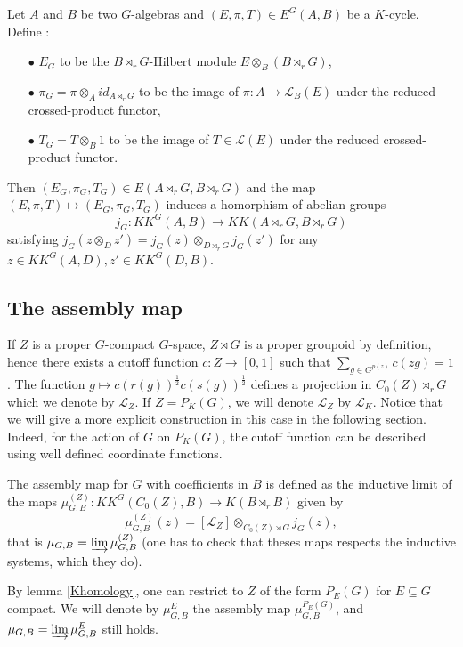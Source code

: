 Let $A$ and $B$ be two $G$-algebras and $(E,\pi,T)\in E^G(A,B)$ be a $K$-cycle. Define :
\begin{itemize}
\item[$\bullet$] $E_G$ to be the $B\rtimes_r G$-Hilbert module $E\otimes_B (B\rtimes_r G)$,
\item[$\bullet$] $\pi_G = \pi\otimes_{A}id_{A\rtimes_r G} $ to be the image of $\pi:A \rightarrow \mathcal L_B(E)$ under the reduced crossed-product functor,
\item[$\bullet$] $T_G = T\otimes_{B}1$ to be the image of $T\in\mathcal L(E)$ under the reduced crossed-product functor.
\end{itemize}
Then $(E_G,\pi_G,T_G)\in E(A\rtimes_r G,B\rtimes_r G)$ and the map $(E,\pi,T)\mapsto (E_G,\pi_G,T_G) $ induces a homorphism of abelian groups
\[j_G : KK^G(A,B)\rightarrow KK(A\rtimes_r G,B\rtimes_r G)\]
satisfying $j_G(z\otimes_D z')=j_G(z)\otimes_{D\rtimes_r G} j_G(z')$ for any $z\in KK^G(A,D), z'\in KK^G(D,B)$.\\ 

\subsection{The assembly map}

If $Z$ is a proper $G$-compact $G$-space, $Z\rtimes G$ is a proper groupoid by definition, hence there exists a cutoff function $c : Z\rightarrow [0,1]$ such that $\sum_{g\in G^{p(z)}} c(zg) = 1$. The function $g\mapsto c(r(g))^{\frac{1}{2}}c(s(g))^{\frac{1}{2}} $ defines a projection in $C_0(Z)\rtimes_r G$ which we denote by $\mathcal L_Z$. If $Z=P_K(G)$, we will denote $\mathcal L_Z$ by $\mathcal L_K$. Notice that we will give a more explicit construction in this case in the following section. Indeed, for the action of $G$ on $P_K(G)$, the cutoff function can be described using well defined coordinate functions. 

\begin{definition}
The assembly map for $G$ with coefficients in $B$ is defined as the inductive limit of the maps $\mu_{G,B}^{(Z)} : KK^G(C_0(Z),B)\rightarrow K(B\rtimes_r B)$ given by
\[\mu_{G,B}^{(Z)} (z)=[\mathcal L_Z]\otimes_{C_0(Z)\rtimes G} j_G(z),\]
that is $\mu_{G,B} = \varinjlim \mu_{G,B}^{(Z)}$ (one has to check that theses maps respects the inductive systems, which they do).\\
\end{definition}

\begin{rk}\label{projection}
By lemma \ref{Khomology}, one can restrict to $Z$ of the form $P_E(G)$ for $E\subseteq G$ compact. We will denote by $\mu_{G,B}^E$ the assembly map $\mu_{G,B}^{P_E(G)}$, and $\mu_{G,B} = \varinjlim \mu_{G,B}^{E}$ still holds.
\end{rk}

